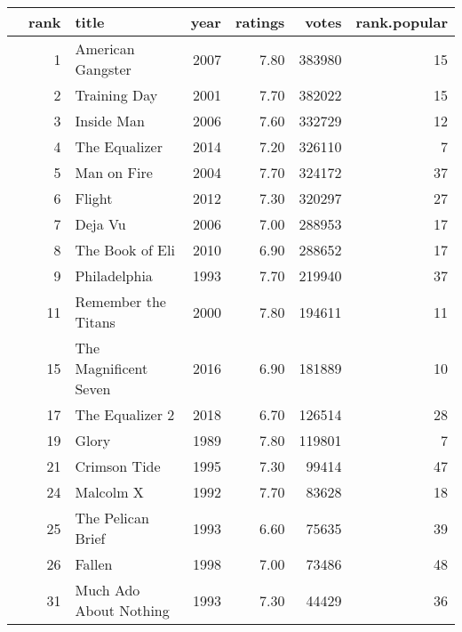 \begin{table}[ht]
\centering
\begin{tabular}{rrlrrrr}
  \hline
 & rank & title & year & ratings & votes & rank.popular \\ 
  \hline
&   1 & American Gangster & 2007 & 7.80 & 383980 &  15 \\ 
&   2 & Training Day & 2001 & 7.70 & 382022 &  15 \\ 
&   3 & Inside Man & 2006 & 7.60 & 332729 &  12 \\ 
&   4 & The Equalizer & 2014 & 7.20 & 326110 &   7 \\ 
&   5 & Man on Fire & 2004 & 7.70 & 324172 &  37 \\ 
&   6 & Flight & 2012 & 7.30 & 320297 &  27 \\ 
&   7 & Deja Vu & 2006 & 7.00 & 288953 &  17 \\ 
&   8 & The Book of Eli & 2010 & 6.90 & 288652 &  17 \\ 
&   9 & Philadelphia & 1993 & 7.70 & 219940 &  37 \\ 
&  11 & Remember the Titans & 2000 & 7.80 & 194611 &  11 \\ 
&  15 & The Magnificent Seven & 2016 & 6.90 & 181889 &  10 \\ 
&  17 & The Equalizer 2 & 2018 & 6.70 & 126514 &  28 \\ 
&  19 & Glory & 1989 & 7.80 & 119801 &   7 \\ 
&  21 & Crimson Tide & 1995 & 7.30 & 99414 &  47 \\ 
&  24 & Malcolm X & 1992 & 7.70 & 83628 &  18 \\ 
&  25 & The Pelican Brief & 1993 & 6.60 & 75635 &  39 \\ 
&  26 & Fallen & 1998 & 7.00 & 73486 &  48 \\ 
&  31 & Much Ado About Nothing & 1993 & 7.30 & 44429 &  36 \\ 
   \hline
\end{tabular}
\end{table}
